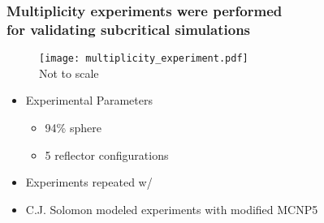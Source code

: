\begin{comment}
\begin{frame}
\frametitle{Nuclear Data Definitions}
\begin{itemize}
	\vspace{-0.21in}
  \item Microscopic Cross sections $\sigma_i$ 
	\begin{itemize}
		\item \colb{total}: $\sigma_t = \sigma_f+\sigma_c+\sigma_s+\cdots$  	
		\item \colb{capture}: X$(n,\xcancel{n})$X'
	\end{itemize} 	
	
	\item The average number of neutrons produced per \colb{induced} fission $\boldsymbol{\overline{\nu}(E)}$
	\begin{itemize} 
  	\item $\displaystyle \nubar = \nubar_{prompt} + \nubar_{delayed}$
	\end{itemize} 

\end{itemize} 

\end{frame} 
\end{comment}


\begin{frame}
\frametitle{Multiplicity experiments were performed  \\ for validating subcritical
simulations}
\begin{minipage}{0.4\linewidth}
    \hspace{-0.3in}
\begin{figure}[h]
\begin{center}
    \texttt{[image: multiplicity\_experiment.pdf]} \\
    {\fontsize{7pt}{6pt}\selectfont  *Not to scale}
\end{center}
\end{figure}
\end{minipage}
\begin{minipage}{0.54\linewidth}
    {\fontsize{10pt}{6pt}\selectfont
        \addtolength\leftmargini{-0.5in}
     \addtolength\leftmarginii{-0.2in}
     \addtolength\wideitemsep{0.1in}
\begin{itemize}
    \item[] Experimental Parameters
  \begin{itemize}
      \item 94\%  sphere \vspace{-0.2in}
      \item 5 reflector configurations \\ 
  \end{itemize}
  \item[] Experiments repeated w/ 
  \item[] C.J. Solomon modeled experiments with modified MCNP5
\end{itemize} 
}
\end{minipage}

\end{frame} 


